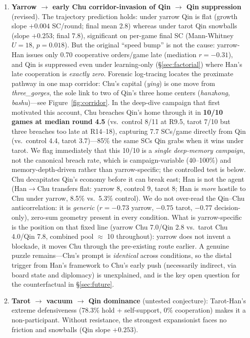 \documentclass[11pt]{article}
\begin{document}
\begin{enumerate}
\item \textbf{Yarrow $\to$ early Chu corridor-invasion of Qin $\to$ Qin suppression} (revised). The trajectory prediction holds: under yarrow Qin is flat (growth slope $+0.004$ SC/round; final mean 2.8) whereas under tarot Qin snowballs (slope $+0.253$; final 7.8), significant on per-game final SC (Mann-Whitney $U = 18$, $p = 0.018$). But the original ``speed bump'' is not the cause: yarrow-Han issues only 0.70 cooperative orders/game late (mediation $r = -0.31$), and Qin is suppressed even under learning-only (\S\ref{sec:factorial}) where Han's late cooperation is \emph{exactly zero}. Forensic log-tracing locates the proximate pathway in one map corridor: Chu's capital (\emph{ying}) is one move from \emph{three\_gorges}, the sole link to two of Qin's three home centers (\emph{hanzhong}, \emph{bashu})---see Figure~\ref{fig:corridor}. In the deep-dive campaign that first motivated this account, Chu breaches Qin's home through it in \textbf{10/10 games at median round 4.5} (vs.\ control 8/11 at R9.5, tarot 7/10 but three breaches too late at R14--18), capturing 7.7 SCs/game directly from Qin (vs.\ control 4.4, tarot 3.7)---85\% the same SCs Qin grabs when it wins under tarot. We flag immediately that this 10/10 is a \emph{single deep-memory campaign}, not the canonical breach rate, which is campaign-variable (40--100\%) and memory-depth-driven rather than yarrow-specific; the controlled test is below. Chu decapitates Qin's economy before it can break east; Han is not the agent (Han$\to$Chu transfers flat: yarrow 8, control 9, tarot 8; Han is \emph{more} hostile to Chu under yarrow, 8.5\% vs.\ 5.3\% control). We do not over-read the Qin--Chu anticorrelation: it is \emph{generic} ($r = -0.73$ yarrow, $-0.75$ tarot, $-0.77$ decision-only), zero-sum geometry present in every condition. What is yarrow-specific is the position on that fixed line (yarrow Chu 7.0/Qin 2.8 vs.\ tarot Chu 4.0/Qin 7.8, combined pool $\approx$ 10 throughout): yarrow does not invent a blockade, it moves Chu through the pre-existing route earlier. A genuine puzzle remains---Chu's prompt is \emph{identical} across conditions, so the distal trigger from Han's framework to Chu's early push (necessarily indirect, via board state and diplomacy) is unexplained, and is the key open question for the counterfactual in \S\ref{sec:future}.
\item \textbf{Tarot $\to$ vacuum $\to$ Qin dominance} (untested conjecture): Tarot-Han's extreme defensiveness (78.3\% hold + self-support, 0\% cooperation) makes it a non-participant. Without resistance, the strongest expansionist faces no friction and snowballs (Qin slope $+0.253$).

\end{enumerate}
\end{document}
